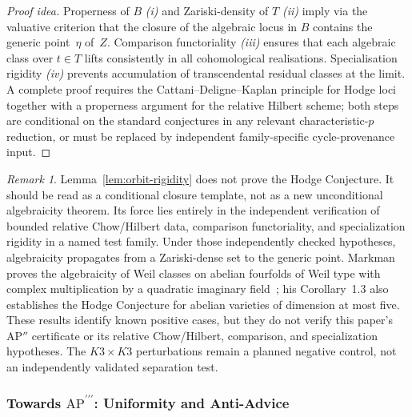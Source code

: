\documentclass[aps,prd,twocolumn,superscriptaddress,nofootinbib]{revtex4-2}
\theoremstyle{definition}
\theoremstyle{remark}
\newtheorem{remark}[theorem]{Remark}
\begin{document}
\begin{proof}[Proof idea]
Properness of $B$ \emph{(i)} and Zariski-density of $T$ \emph{(ii)} imply via
the valuative criterion that the closure of the algebraic locus in $B$
contains the generic point~$\eta$ of~$Z$.  Comparison functoriality \emph{(iii)}
ensures that each algebraic class over $t\in T$ lifts consistently in all
cohomological realisations.  Specialisation rigidity \emph{(iv)} prevents
accumulation of transcendental residual classes at the limit.  A complete
proof requires the Cattani--Deligne--Kaplan principle for Hodge loci
\cite{CattaniDeligneKaplan1995} together with a properness argument for
the relative Hilbert scheme; both
steps are conditional on the standard conjectures in any relevant
characteristic-$p$ reduction, or must be replaced by independent
family-specific cycle-provenance input.
\end{proof}

\begin{remark}
\label{rem:ap-double-prime}
Lemma~\ref{lem:orbit-rigidity} does not prove the Hodge Conjecture.
It should be read as a conditional closure template, not as a new
unconditional algebraicity theorem. Its force lies entirely in the
independent verification of bounded relative Chow/Hilbert data, comparison
functoriality, and specialization rigidity in a named test family. Under
those independently checked hypotheses, algebraicity propagates from a
Zariski-dense set to the generic point.  Markman proves the algebraicity of Weil classes on abelian fourfolds of Weil type with complex multiplication by a quadratic imaginary field~\cite{Markman2025}; his Corollary~1.3 also establishes the Hodge Conjecture for abelian varieties of dimension at most five.  These results identify known positive cases, but they do not verify this paper's AP$''$ certificate or its relative Chow/Hilbert, comparison, and specialization hypotheses.  The $K3\times K3$ perturbations remain a planned negative control, not an independently validated separation test.
\end{remark}

\subsubsection*{Towards \texorpdfstring{$\mathrm{AP}^{\prime\prime\prime}$}{AP'''}: Uniformity and Anti-Advice}
\label{subsec:ap-triple-prime}
\end{document}
